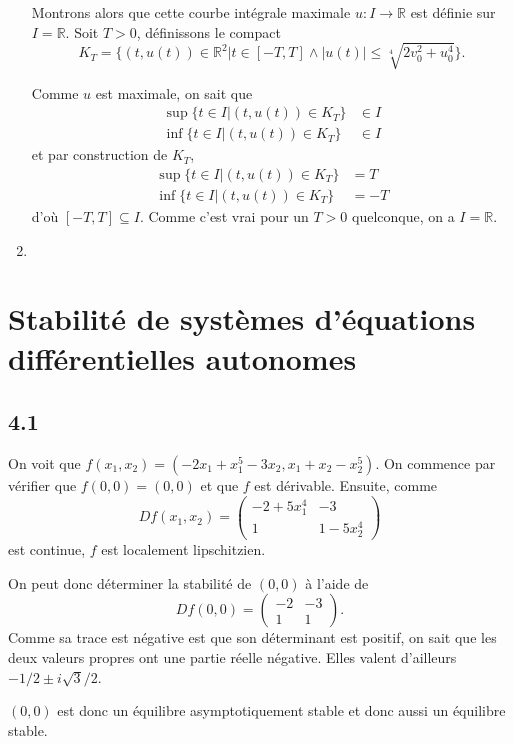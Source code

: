 \documentclass{article}
\begin{document}
\begin{enumerate}
    Montrons alors que cette courbe intégrale maximale $u:I\to\mathbb{R}$
    est définie sur $I = \mathbb{R}$.
    Soit $T > 0$, définissons le compact
    \[ K_T = \{(t,u(t)) \in \mathbb{R}^2
    | t \in [-T,T] \land |u(t)| \leq \sqrt[4]{2v_0^2 + u_0^4}\}. \]

    Comme $u$ est maximale, on sait que
    \begin{align*}
      \sup\{t \in I | (t,u(t)) \in K_T\} & \in I\\
      \inf\{t \in I | (t,u(t)) \in K_T\} & \in I
    \end{align*}
    et par construction de $K_T$,
    \begin{align*}
      \sup\{t \in I | (t,u(t)) \in K_T\} & = T\\
      \inf\{t \in I | (t,u(t)) \in K_T\} & = -T
    \end{align*}
    d'où $[-T,T] \subseteq I$.
    Comme c'est vrai pour un $T > 0$ quelconque, on a $I = \mathbb{R}$.
  \item
\end{enumerate}

\section{Stabilité de systèmes d'équations différentielles autonomes}

\subsection*{4.1}
On voit que $f(x_1,x_2) = (-2x_1 + x_1^5 - 3x_2, x_1 + x_2 - x_2^5)$.
On commence par vérifier que $f(0,0) = (0,0)$ et que $f$ est dérivable.
Ensuite, comme
\[ Df(x_1,x_2) =
\begin{pmatrix}
  -2 + 5x_1^4 & -3\\
  1 & 1 - 5x_2^4
\end{pmatrix} \]
est continue, $f$ est localement lipschitzien.

On peut donc déterminer la stabilité de $(0,0)$ à l'aide de
\[ Df(0, 0) =
\begin{pmatrix}
  -2 & -3\\
  1 & 1
\end{pmatrix}. \]
Comme sa trace est négative est que son déterminant est positif,
on sait que les deux valeurs propres ont une partie réelle négative.
Elles valent d'ailleurs $-1/2 \pm i\sqrt{3}/2$.

$(0,0)$ est donc un équilibre asymptotiquement stable et donc aussi
un équilibre stable.
\end{document}
